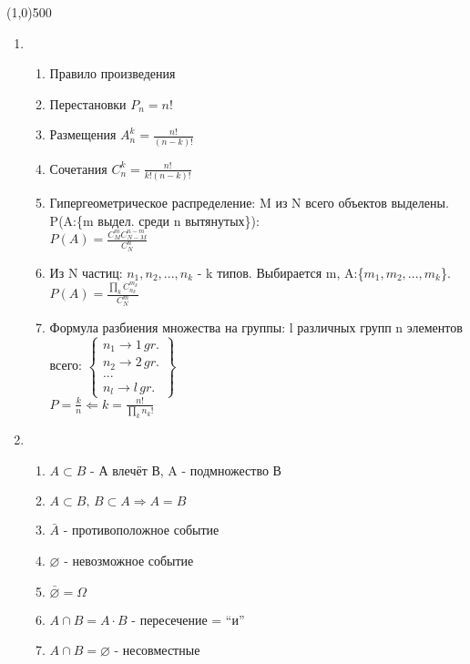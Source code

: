 


\fontsize{20}{24}
\line(1,0){500}
\fontsize{12}{15}
\begin{enumerate}[label=\textbf{\underline{\arabic*.}}]
\item \begin{enumerate}
      \item Правило произведения
      \item Перестановки $ P_n = n! $
      \item Размещения $ A^k_n = \frac{n!}{(n-k)!} $
      \item Сочетания $ C^k_n = \frac{n!}{k!(n-k)!} $
      \item Гипергеометрическое распределение: M из N всего объектов выделены. P(A:\{m выдел. среди n вытянутых\}):\\
      $ P(A)=\frac{C^m_M C^{n-m}_{N-M}}{C^n_N} $
      \item Из N частиц: ${n_1,n_2,...,n_k}$ - k типов. Выбирается m, A:\{${m_1,m_2,...,m_k}$\}.\\
      $ P(A)=\frac{\prod\limits_k C^{m_k}_{n_k}}{C^m_N} $
      \item Формула разбиения множества на группы: l различных групп n элементов всего:
      $ \left\{ \begin{smallmatrix}
      n_1 \rightarrow 1\, gr. \\n_2 \rightarrow 2\, gr. \\...\\n_l\rightarrow l\, gr.
      \end{smallmatrix} \right\} $\\
      $ P=\frac{k}{n} \Leftarrow k=\frac{n!}{\prod\limits_k n_k!} $
      \end{enumerate}
\item \begin{enumerate}
      \item $A \subset B$ - А влечёт В, A - подмножество В
      \item $A\subset B,\,B\subset A \Rightarrow A=B$
      \item $\bar{A}$ - противоположное событие
      \item $\varnothing$ - невозможное событие
      \item $\bar{\varnothing}=\Omega$
      \item $A\cap B = A\cdot B$ - пересечение = ``и''
      \item $A\cap B = \varnothing$ - несовместные

\end{enumerate}
\end{enumerate}
